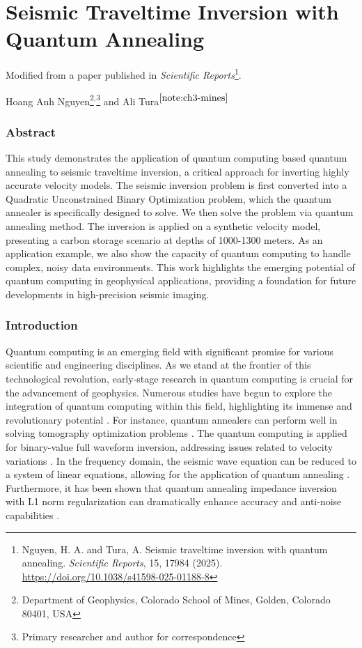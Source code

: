 \chapter{Seismic Traveltime Inversion with Quantum Annealing}\label{chap:seismic-qa}

\begin{center}
    Modified from a paper published in \emph{Scientific Reports}\footnote{Nguyen, H. A. and Tura, A. Seismic traveltime inversion with quantum annealing. \emph{Scientific Reports}, 15, 17984 (2025). \href{https://doi.org/10.1038/s41598-025-01188-8}{https://doi.org/10.1038/s41598-025-01188-8}}.

    Hoang Anh Nguyen\footnote{Department of Geophysics, Colorado School of Mines, Golden, Colorado 80401, USA\label{note:ch3-mines}}$^,$\footnote{Primary researcher and author for correspondence}
    and Ali Tura$^{\ref{note:ch3-mines}}$
\end{center}

\subsection{Abstract}

This study demonstrates the application of quantum computing based quantum annealing to seismic traveltime inversion, a critical approach for inverting highly accurate velocity models. The seismic inversion problem is first converted into a Quadratic Unconstrained Binary Optimization problem, which the quantum annealer is specifically designed to solve. We then solve the problem via quantum annealing method. The inversion is applied on a synthetic velocity model, presenting a carbon storage scenario at depths of 1000-1300 meters. As an application example, we also show the capacity of quantum computing to handle complex, noisy data environments. This work highlights the emerging potential of quantum computing in geophysical applications, providing a foundation for future developments in high-precision seismic imaging.

\subsection{Introduction}

Quantum computing is an emerging field with significant promise for various scientific and engineering disciplines. As we stand at the frontier of this technological revolution, early-stage research in quantum computing is crucial for the advancement of geophysics. Numerous studies have begun to explore the integration of quantum computing within this field, highlighting its immense and revolutionary potential \cite{moradi18}. For instance, quantum annealers can perform well in solving tomography optimization problems \cite{sarkar18}.  The quantum computing is applied for binary-value full waveform inversion, addressing issues related to velocity variations \cite{greer20}. In the frequency domain, the seismic wave equation can be reduced to a system of linear equations, allowing for the application of quantum annealing \cite{kumar22}. Furthermore, it has been shown that quantum annealing impedance inversion with L1 norm regularization can dramatically enhance accuracy and anti-noise capabilities \cite{wang24}.

